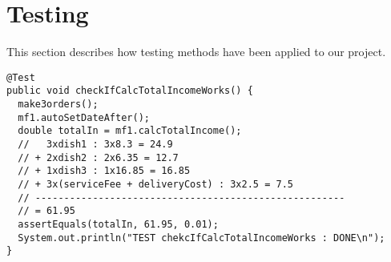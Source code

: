 \section{Testing} %
\label{sec:testing}
This section describes how testing methods have been applied to our project.

\begin{lstlisting}[caption=Example of a test using \texttt{assertEquals} with 2 decimal precision.,
  label=lst:test_total_income]
@Test
public void checkIfCalcTotalIncomeWorks() {
  make3orders();
  mf1.autoSetDateAfter();
  double totalIn = mf1.calcTotalIncome();
  //   3xdish1 : 3x8.3 = 24.9
  // + 2xdish2 : 2x6.35 = 12.7
  // + 1xdish3 : 1x16.85 = 16.85
  // + 3x(serviceFee + deliveryCost) : 3x2.5 = 7.5
  // ------------------------------------------------------
  // = 61.95
  assertEquals(totalIn, 61.95, 0.01);
  System.out.println("TEST chekcIfCalcTotalIncomeWorks : DONE\n");
}
\end{lstlisting}

